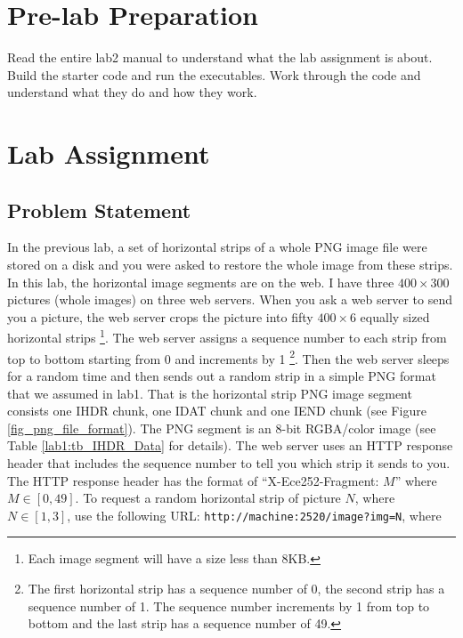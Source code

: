 \section{Pre-lab Preparation}
Read the entire lab2 manual to understand what the lab assignment is about. Build the starter code and run the executables. Work through the code and understand what they do and how they work.


\section{Lab Assignment}
\subsection{Problem Statement}
\label{sec:lab2_problem_statement}
In the previous lab, a set of horizontal strips of a whole PNG image file were stored on a disk and you were asked to restore the whole image from these strips. In this lab, the horizontal image segments are on the web. I have  three $400 \times 300$ pictures (whole images) on three web servers. When you ask a web server to send you a picture, the web server crops the picture into fifty
$400 \times 6$ equally sized horizontal strips
\footnote{Each image segment will have a size less than 8KB.}. The web server assigns a sequence number to each strip from top to bottom starting from 0 and increments by 1
\footnote{The first horizontal strip has a sequence number of 0, the second strip has a sequence number of 1. The sequence number increments by 1 from top to bottom and the last strip has a sequence number of 49.}. Then the web server sleeps for a random time and then sends out a random strip in a simple PNG format that we assumed in lab1. That is the horizontal strip PNG image segment consists one IHDR chunk, one IDAT chunk and one IEND chunk (see Figure \ref{fig_png_file_format}). The PNG segment is an 8-bit RGBA/color image (see Table \ref{lab1:tb_IHDR_Data} for details). The web server uses an HTTP response header that includes the sequence number to tell you which strip it sends to you. The HTTP response header has the format of ``X-Ece252-Fragment: $M$'' where $M \in [0, 49]$. To request a random horizontal strip of picture $N$, where $N\in[1,3]$, use the following URL:
\verb+http://machine:2520/image?img=N+, where

